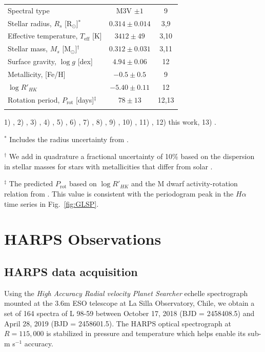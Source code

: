 \documentclass[longauth]{aa}
\newcommand{\prot}{$P_{\text{rot}}$}
\newcommand{\mps}{m s$^{-1}$}
\newcommand{\teff}{$T_{\text{eff}}$}
\begin{document}
\begin{table}[t]
\begin{tabular}{lcc}
    Spectral type & M3V $\pm 1$ & 9 \\
    Stellar radius, $R_s$ [R$_{\odot}$]$^*$ & $0.314\pm 0.014$ & 3,9 \\
    Effective temperature, \teff{} [K] & $3412\pm 49$ & 3,10 \\
    Stellar mass, $M_s$ [M$_{\odot}$]$^{\dagger}$ & $0.312\pm 0.031$ & 3,11 \\
    Surface gravity, $\log{g}$ [dex] & $4.94\pm 0.06$ & 12 \\
    Metallicity, [Fe/H] & $-0.5\pm 0.5$ & 9 \\
    $\log{R'_{HK}}$ & $-5.40\pm 0.11$ & 12 \\
    Rotation period, \prot{} [days]$^{\ddagger}$ & $78\pm 13$ & 12,13 \\
    \hline\noalign{\smallskip}
  \end{tabular}
  
  \begin{list}{}{}
    \item 1) \citealt{gaia18}, 2) \citealt{lindegren18}, 3) \citealt{cloutier19b}, 4) \citealt{henden16}, 5) \citealt{evans18}, 6) \citealt{stassun17}, 7) \citealt{cutri03}, 8) \citealt{cutri13}, 9) \citealt{kostov19}, 10) \citealt{mann15}, 11) \citealt{benedict16}, 12) this work, 13) \citealt{astudillodefru17b}.
    \item $^*$ Includes the radius uncertainty from \citep{kostov19}. 
    \item $^{\dagger}$ We add in quadrature a fractional uncertainty of 10\% based on the dispersion in stellar masses for stars with metallicities that differ from solar \citep{mann19}.
    \item $^{\ddagger}$ The predicted \prot{} based on $\log{R'_{HK}}$ and the M dwarf activity-rotation relation from \cite{astudillodefru17b}. This value is consistent with the periodogram peak in the $H\alpha$ time series in Fig.~\ref{fig:GLSP}.
  \end{list}
\end{table}

\section{HARPS Observations}
\label{sec:rv}
\subsection{HARPS data acquisition}
Using the \textit{High Accuracy Radial velocity Planet Searcher} \citep[HARPS;][]{mayor03} echelle spectrograph mounted at the 3.6m ESO telescope at La Silla Observatory, Chile, we obtain a set of 164 spectra of L 98-59 between October 17, 2018 (BJD = 2458408.5) and April 28, 2019 (BJD = 2458601.5). The HARPS optical spectrograph at $R=115,000$ is stabilized in pressure and temperature which helps enable its sub-\mps{} accuracy. 
\end{document}
